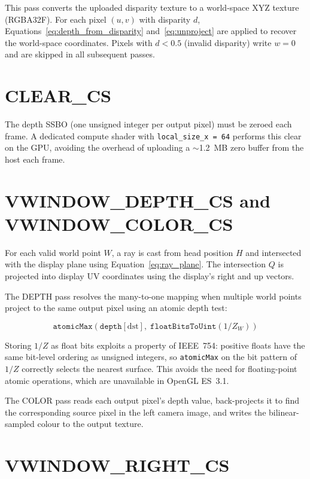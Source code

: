 \documentclass[11pt, a4paper]{report}
\begin{document}
This pass converts the uploaded disparity texture to a world-space
XYZ texture (RGBA32F).
For each pixel $(u, v)$ with disparity $d$, Equations~\ref{eq:depth_from_disparity}
and~\ref{eq:unproject} are applied to recover the world-space
coordinates.
Pixels with $d < 0.5$ (invalid disparity) write $w = 0$ and are skipped
in all subsequent passes.

\section{CLEAR\_CS}

The depth SSBO (one unsigned integer per output pixel) must be zeroed
each frame.
A dedicated compute shader with \texttt{local\_size\_x = 64} performs
this clear on the GPU, avoiding the overhead of uploading a
$\sim$1.2~MB zero buffer from the host each frame.

\section{VWINDOW\_DEPTH\_CS and VWINDOW\_COLOR\_CS}

For each valid world point $W$, a ray is cast from head position $H$ and
intersected with the display plane using Equation~\ref{eq:ray_plane}.
The intersection $Q$ is projected into display UV coordinates using the
display's right and up vectors.

The DEPTH pass resolves the many-to-one mapping when multiple world
points project to the same output pixel using an atomic depth test:

\begin{equation}
    \texttt{atomicMax}(\texttt{depth}[\text{dst}],\;
    \texttt{floatBitsToUint}(1/Z_W))
    \label{eq:atomic_depth}
\end{equation}

Storing $1/Z$ as float bits exploits a property of IEEE~754: positive
floats have the same bit-level ordering as unsigned integers, so
\texttt{atomicMax} on the bit pattern of $1/Z$ correctly selects the
nearest surface.
This avoids the need for floating-point atomic operations, which are
unavailable in OpenGL ES~3.1.

The COLOR pass reads each output pixel's depth value, back-projects it
to find the corresponding source pixel in the left camera image, and
writes the bilinear-sampled colour to the output texture.

\section{VWINDOW\_RIGHT\_CS}
\end{document}
